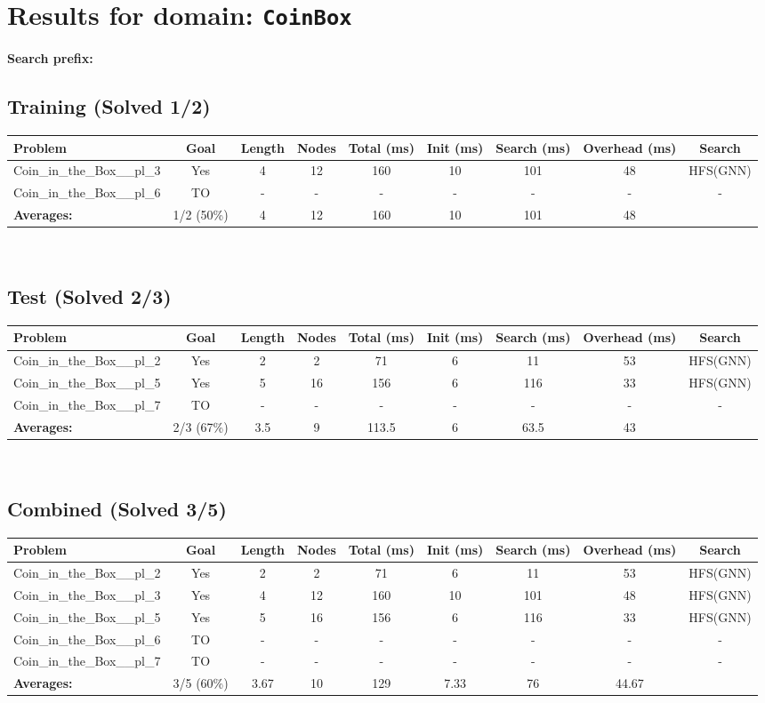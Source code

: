 \documentclass{article}
\begin{document}
\section*{Results for domain: \texttt{CoinBox}}
\textbf{Search prefix:} 
\\[0.5cm]
\subsection*{Training (Solved 1/2)}
\begin{tabular}{lcccccccc}
\toprule
Problem & Goal & Length & Nodes & Total (ms) & Init (ms) & Search (ms) & Overhead (ms) & Search \\
\midrule
Coin\_in\_the\_Box\_\_pl\_3 & Yes & 4 & 12 & 160 & 10 & 101 & 48 & HFS(GNN) \\
Coin\_in\_the\_Box\_\_pl\_6 & TO & - & - & - & - & - & - & - \\
\textbf{Averages:} & 1/2 (50\%) & 4 & 12 & 160 & 10 & 101 & 48 & \\
\bottomrule
\end{tabular}
\\[0.7cm]
\subsection*{Test (Solved 2/3)}
\begin{tabular}{lcccccccc}
\toprule
Problem & Goal & Length & Nodes & Total (ms) & Init (ms) & Search (ms) & Overhead (ms) & Search \\
\midrule
Coin\_in\_the\_Box\_\_pl\_2 & Yes & 2 & 2 & 71 & 6 & 11 & 53 & HFS(GNN) \\
Coin\_in\_the\_Box\_\_pl\_5 & Yes & 5 & 16 & 156 & 6 & 116 & 33 & HFS(GNN) \\
Coin\_in\_the\_Box\_\_pl\_7 & TO & - & - & - & - & - & - & - \\
\textbf{Averages:} & 2/3 (67\%) & 3.5 & 9 & 113.5 & 6 & 63.5 & 43 & \\
\bottomrule
\end{tabular}
\\[0.7cm]
\subsection*{Combined (Solved 3/5)}
\begin{tabular}{lcccccccc}
\toprule
Problem & Goal & Length & Nodes & Total (ms) & Init (ms) & Search (ms) & Overhead (ms) & Search \\
\midrule
Coin\_in\_the\_Box\_\_pl\_2 & Yes & 2 & 2 & 71 & 6 & 11 & 53 & HFS(GNN) \\
Coin\_in\_the\_Box\_\_pl\_3 & Yes & 4 & 12 & 160 & 10 & 101 & 48 & HFS(GNN) \\
Coin\_in\_the\_Box\_\_pl\_5 & Yes & 5 & 16 & 156 & 6 & 116 & 33 & HFS(GNN) \\
Coin\_in\_the\_Box\_\_pl\_6 & TO & - & - & - & - & - & - & - \\
Coin\_in\_the\_Box\_\_pl\_7 & TO & - & - & - & - & - & - & - \\
\textbf{Averages:} & 3/5 (60\%) & 3.67 & 10 & 129 & 7.33 & 76 & 44.67 & \\
\bottomrule
\end{tabular}
\\[0.7cm]
\end{document}
